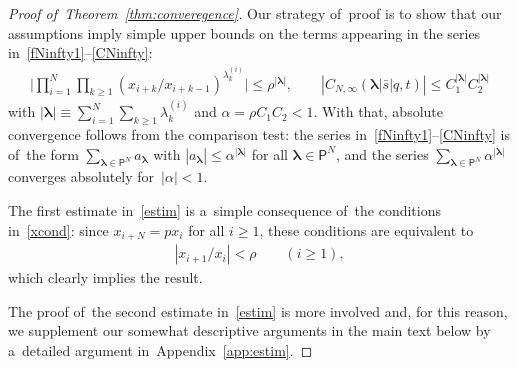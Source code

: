 \documentclass[pdftex]{sigma}%
\numberwithin{equation}{section}
\newcommand{\vlam}{\boldsymbol{\lambda}}
\newcommand{\bs}{\bar{s}}
\begin{document}
\begin{proof}[Proof of~Theorem~\ref{thm:converegence}]
Our strategy of~proof is to show that our assumptions imply simple upper bounds on the terms appearing in the series in~\eqref{fNinfty1}--\eqref{CNinfty}:
\begin{gather}
\label{estim}
\Bigg|\prod_{i=1}^N\prod_{k\geq 1}(x_{i+k}/x_{i+k-1})^{\lambda^{(i)}_k}\Bigg|\leq \rho^{|\vlam|},\qquad \left|C_{N,\infty}(\vlam|\bs|q,t)\right|\leq C_1^{|\vlam|}C_2^{|\vlam|}
\end{gather}
with $|\vlam|\equiv \sum_{i=1}^N \sum_{k\geq 1}\lambda^{(i)}_k$ and $\alpha = \rho C_1C_2<1$.
With that, absolute convergence follows from the comparison test: the series in~\eqref{fNinfty1}--\eqref{CNinfty} is of~the form $\sum_{\vlam\in\mathsf{P}^N} a_{\vlam}$ with $|a_{\vlam}|\leq \alpha^{|\vlam|}$ for all $\vlam\in\mathsf{P}^N$,
and the series $\sum_{\vlam\in\mathsf{P}^N} \alpha^{|\vlam|}$ converges absolutely for~$|\alpha|<1$.

The first estimate in~\eqref{estim} is a~simple consequence of~the conditions in~\eqref{xcond}: since \allowbreak \mbox{$x_{i+N}=px_i$} for all $i\geq 1$, these conditions are equivalent to
\begin{gather*}
|x_{i+1}/x_i| < \rho\qquad (i\geq 1) ,
\end{gather*}
which clearly implies the result.

The proof of~the second estimate in~\eqref{estim} is more involved and, for this reason, we supplement our somewhat descriptive arguments in the main text below by a~detailed argument in~Appendix~\ref{app:estim}.


\end{proof}
\end{document}
